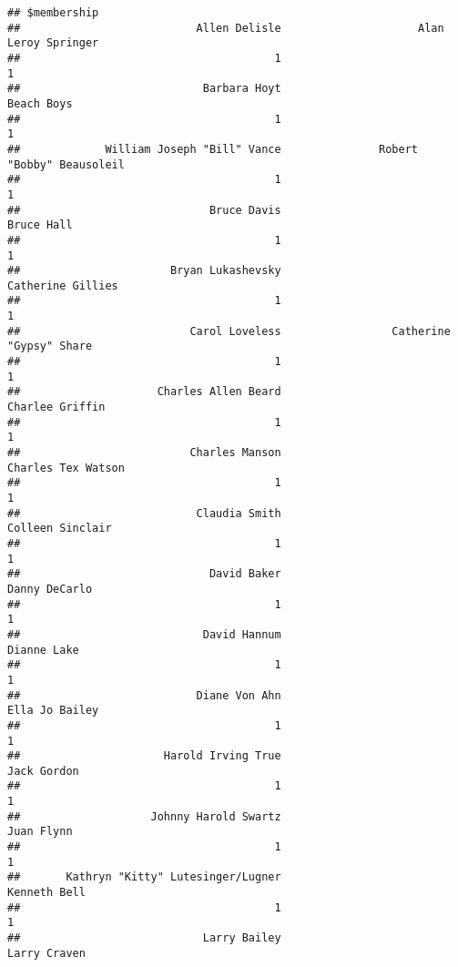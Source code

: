 \documentclass[
]{article}
\begin{document}
\begin{verbatim}
## $membership
##                           Allen Delisle                     Alan Leroy Springer 
##                                       1                                       1 
##                            Barbara Hoyt                              Beach Boys 
##                                       1                                       1 
##             William Joseph "Bill" Vance               Robert "Bobby" Beausoleil 
##                                       1                                       1 
##                             Bruce Davis                              Bruce Hall 
##                                       1                                       1 
##                       Bryan Lukashevsky                       Catherine Gillies 
##                                       1                                       1 
##                          Carol Loveless                 Catherine "Gypsy" Share 
##                                       1                                       1 
##                     Charles Allen Beard                         Charlee Griffin 
##                                       1                                       1 
##                          Charles Manson                      Charles Tex Watson 
##                                       1                                       1 
##                           Claudia Smith                        Colleen Sinclair 
##                                       1                                       1 
##                             David Baker                           Danny DeCarlo 
##                                       1                                       1 
##                            David Hannum                             Dianne Lake 
##                                       1                                       1 
##                           Diane Von Ahn                          Ella Jo Bailey 
##                                       1                                       1 
##                      Harold Irving True                             Jack Gordon 
##                                       1                                       1 
##                    Johnny Harold Swartz                              Juan Flynn 
##                                       1                                       1 
##       Kathryn "Kitty" Lutesinger/Lugner                            Kenneth Bell 
##                                       1                                       1 
##                            Larry Bailey                            Larry Craven 

\end{verbatim}
\end{document}
